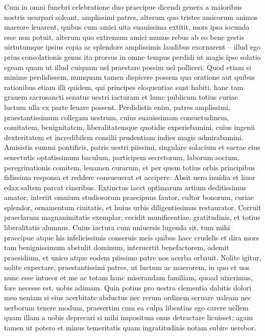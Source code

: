 \documentclass[a5paper,twoside]{article}
\begin{document}
Cum in omni funebri celebratione duo praecipue dicendi genera a maioribus nostris usurpari soleant, amplissimi patres, alterum quo tristes amicorum animos maerore leuarent, quibus cum amici uita suauissima extitit, mors ipsa iocunda esse non potuit, alterum quo extremum amici munus rebus ab eo bene gestis uirtutumque ipsius copia ac splendore amplissimis laudibus exornarent – illud ego prius consolationis genus ita prorsus in omne tempus perdidi ut magis ipse solatio egeam quam ut illud cuiquam uel praestare possim uel polliceri. Quod etiam si minime perdidissem, numquam tamen dispicere possem qua oratione aut quibus rationibus etiam illi quidem, qui principes eloquentiae sunt habiti, hanc tam grauem sacrosancti senatus uestri iacturam et hunc publicum totius curiae luctum ulla ex parte leuare possent. Perdidistis enim, patres amplissimi, praestantissimum collegam uestrum, cuius suauissimam consuetudinem, comitatem, benignitatem, liberalitatemque quotidie experiebamini, cuius ingenii dexteritatem et incredibilem consilii prudentiam indies magis admirabamini. Amisistis summi pontificis, patris uestri piissimi, singulare solacium et sacrae eius senectutis optatissimum baculum, participem secretorum, laborum socium, peregrinationis comitem, leuamen curarum, et per quem totius orbis principibus fidissima responsa et reddere consueuerat et accipere. Absit uero inuidia et liuor edax saltem parcat cineribus. Extinctus iacet optimarum artium deditissimus amator, interiit omnium studiosorum praecipuus fautor, cultor bonorum, curiae splendor, ornamentum ciuitatis, et huius urbis diligentissimus restaurator. Corruit praeclarum magnanimitatis exemplar; cecidit munificentiae, gratitudinis, et totius liberalitatis alumnus. Cuius iactura cum uniuersis lugenda sit, tum mihi praecipue atque his infelicissimis conseruis meis quibus haec crudelis et dira mors tam benignissimum abstulit dominum, interuertit benefactorem, ademit praesidium, et unico atque eodem piissimo patre nos acerba orbauit. Nolite igitur, nolite expectare, praestantissimi patres, ut luctum ac maerorem, in quo et uos nunc esse intueor et me ac totam hanc miserandam familiam, quoad uixerimus, fore necesse est, uobis adimam. Quin potius pro uestra clementia dabitis dolori meo ueniam si eius acerbitate abductus nec rerum ordinem seruare ualeam nec uerborum tenere modum, praesertim cum ea culpa libentius ego carere uellem quam illam a uobis deprecari si mihi impositum onus detractare licuisset; agam tamen ut potero et minus temeritatis quam ingratitudinis notam subire uerebor.
\end{document}
